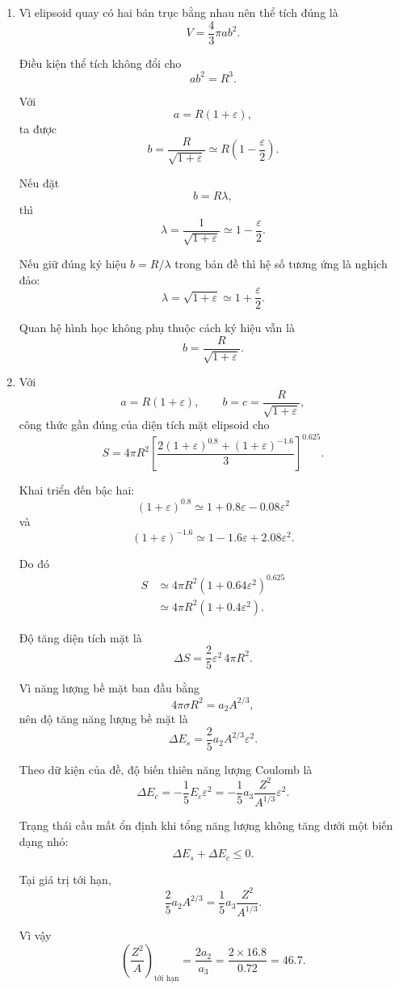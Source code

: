 \documentclass[12pt,a4paper]{article}
\begin{document}
\begin{enumerate}[leftmargin=*,itemsep=1em]
Với hai chữ số có nghĩa,
$$
\left(\frac{Z^2}{A}\right)_{\min}\simeq 16.
$$

\item
Vì elipsoid quay có hai bán trục bằng nhau nên thể tích đúng là
$$
V=\frac43\pi ab^2.
$$

Điều kiện thể tích không đổi cho
$$
ab^2=R^3.
$$

Với
$$
a=R(1+\varepsilon),
$$
ta được
$$
b=\frac{R}{\sqrt{1+\varepsilon}}
\simeq R\left(1-\frac{\varepsilon}{2}\right).
$$

Nếu đặt
$$
b=R\lambda,
$$
thì
$$
\lambda=\frac{1}{\sqrt{1+\varepsilon}}
\simeq1-\frac{\varepsilon}{2}.
$$

Nếu giữ đúng ký hiệu $b=R/\lambda$ trong bản đề thì hệ số tương ứng là nghịch
đảo:
$$
\lambda=\sqrt{1+\varepsilon}
\simeq1+\frac{\varepsilon}{2}.
$$

Quan hệ hình học không phụ thuộc cách ký hiệu vẫn là
$$
b=\frac{R}{\sqrt{1+\varepsilon}}.
$$

\begin{center}
\end{center}

\item
Với
$$
a=R(1+\varepsilon),
\qquad
b=c=\frac{R}{\sqrt{1+\varepsilon}},
$$
công thức gần đúng của diện tích mặt elipsoid cho
$$
S
=4\pi R^2
\left[
\frac{2(1+\varepsilon)^{0.8}
+(1+\varepsilon)^{-1.6}}{3}
\right]^{0.625}.
$$

Khai triển đến bậc hai:
$$
(1+\varepsilon)^{0.8}
\simeq1+0.8\varepsilon-0.08\varepsilon^2
$$
và
$$
(1+\varepsilon)^{-1.6}
\simeq1-1.6\varepsilon+2.08\varepsilon^2.
$$

Do đó
$$
\begin{aligned}
S
&\simeq4\pi R^2
\left(1+0.64\varepsilon^2\right)^{0.625}\\
&\simeq4\pi R^2
\left(1+0.4\varepsilon^2\right).
\end{aligned}
$$

Độ tăng diện tích mặt là
$$
\Delta S
=\frac25\varepsilon^2\,4\pi R^2.
$$

Vì năng lượng bề mặt ban đầu bằng
$$
4\pi\sigma R^2=a_2A^{2/3},
$$
nên độ tăng năng lượng bề mặt là
$$
\Delta E_s
=\frac25a_2A^{2/3}\varepsilon^2.
$$

Theo dữ kiện của đề, độ biến thiên năng lượng Coulomb là
$$
\Delta E_c
=-\frac15E_c\varepsilon^2
=-\frac15a_3\frac{Z^2}{A^{1/3}}\varepsilon^2.
$$

Trạng thái cầu mất ổn định khi tổng năng lượng không tăng dưới một biến dạng
nhỏ:
$$
\Delta E_s+\Delta E_c\leq0.
$$

Tại giá trị tới hạn,
$$
\frac25a_2A^{2/3}
=\frac15a_3\frac{Z^2}{A^{1/3}}.
$$

Vì vậy
$$
\left(\frac{Z^2}{A}\right)_{\text{tới hạn}}
=\frac{2a_2}{a_3}
=\frac{2\times16.8}{0.72}
=46.7.
$$

\end{enumerate}
\end{document}
